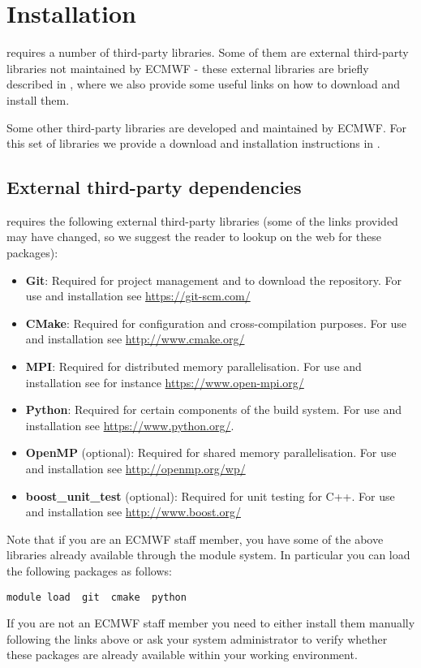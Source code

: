 \section{Installation}
\label{s:installation}
\Atlas requires a number of third-party libraries. 
Some of them are external third-party libraries not maintained 
by ECMWF - these external libraries are briefly described 
in , where we also provide some 
useful links on how to download and install them. 

Some other third-party libraries are developed and maintained 
by ECMWF. For this set of libraries we provide a download and 
installation instructions in .

\subsection{External third-party dependencies}
\label{s:external-libs}
\Atlas requires the following external third-party libraries 
(some of the links provided may have changed, so we suggest 
the reader to lookup on the web for these packages):
%
\begin{itemize}
\item \textbf{Git}: Required for project management and to download 
the repository. For use and installation see \url{https://git-scm.com/}
\item \textbf{CMake}: Required for configuration and cross-compilation 
purposes. For use and installation see \url{http://www.cmake.org/}
\item \textbf{MPI}: Required for distributed memory parallelisation.
For use and installation see for instance \url{https://www.open-mpi.org/}
\item \textbf{Python}: Required for certain components of the build system.
For use and installation see \url{https://www.python.org/}.
\item \textbf{OpenMP} (optional): Required for shared memory 
parallelisation. For use and installation see \url{http://openmp.org/wp/}
\item \textbf{boost\_unit\_test} (optional): Required for unit testing 
for C++. For use and installation see \url{http://www.boost.org/}
\end{itemize}
%
Note that if you are an ECMWF staff member, you have some of the above 
libraries already available through the module system. In particular 
you can load the following packages as follows:
%
\begin{lstlisting}[style=BashStyle]
module load  git  cmake  python
\end{lstlisting}
%
If you are not an ECMWF staff member you need to either install them 
manually following the links above or ask your system administrator 
to verify whether these packages are already available within your 
working environment.



